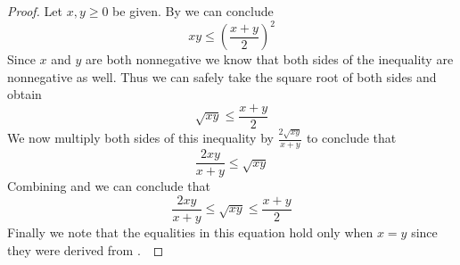         \begin{proof}
            Let $x, y \ge 0$ be given. By  we can conclude
            \[
                xy \le \left(\frac{x + y}{2}\right)^2
            \]
            Since $x$ and $y$ are both nonnegative we know that both sides of the inequality
            are nonnegative as well. Thus we can safely take the square root of both sides
            and obtain
            \begin{equation}
                \label{AGM 1}
                \sqrt{xy} \le \frac{x + y}{2}
            \end{equation}
            We now multiply both sides of this inequality by $\frac{2\sqrt{xy}}{x + y}$ to
            conclude that
            \begin{equation}
                \label{AGM 2}
                \frac{2xy}{x + y} \le \sqrt{xy}
            \end{equation}
            Combining  and  we can conclude that
            \[
                \frac{2xy}{x + y} \le \sqrt{xy} \le \frac{x + y}{2}
            \]
            Finally we note that the equalities in this equation hold only when $x = y$
            since they were derived from .~\QED
        \end{proof}
